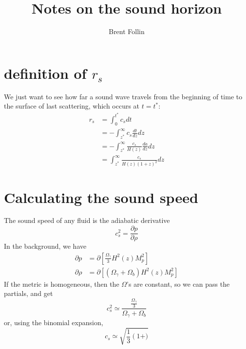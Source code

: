 \documentclass{emulateapj}
\begin{document}
\title{Notes on the sound horizon}
\author{Brent Follin}
\section{definition of $r_s$}
We just want to see how far a sound wave travels from the beginning of time to the surface of last scattering, which occurs at $t = t^*$:
\begin{align*}
r_s &= \int_0^{t^*} c_s dt \\
&= -\int_{z^*}^{\infty} c_s \frac{dt}{dz}dz \\
&= -\int_{z^*}^{\infty} \frac{c_s}{H(z)} \frac{da}{dz} dz \\
&= \int_{z^*}^{\infty} \frac{c_s}{H(z) (1+z)^2} dz 
\end{align*}

\section{Calculating the sound speed}
The sound speed of any fluid is the adiabatic derivative
\begin{equation*}
c_s^2 = \frac{\partial p}{\partial \rho} 
\end{equation*}
In the background, we have 
\begin{align*}
{\partial p} &= \partial \left[\frac{\Omega_{\gamma}}{3}H^2(z) M_p^2\right] \\
{\partial \rho} &= \partial \left[ \left(\Omega_{\gamma} + \Omega_{b} \right) H^2(z) M_p^2 \right]
\end{align*}
If the metric is homogeneous, then the $\Omega$'s are constant, so we can pass the partials, and get 
\begin{equation*}
c_s^2 \simeq \frac{\frac{\Omega_{\gamma}}{3}}{\Omega_{\gamma} + \Omega_{b}}
\end{equation*}
or, using the binomial expansion, 
\begin{equation*}
c_s \simeq \sqrt{\frac{1}{3} \left(1 + )}
\end{equation*}
\end{document}
